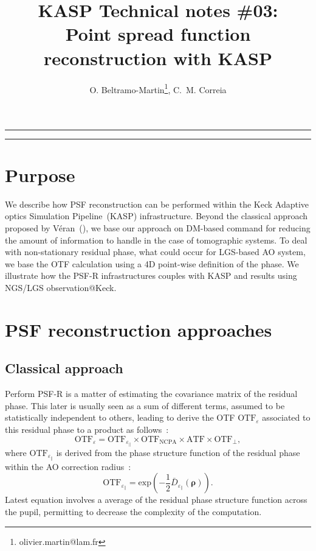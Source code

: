 \documentclass[12pt]{article}
\title{KASP Technical notes \#03:\\ Point spread function reconstruction with KASP}
\author{O. Beltramo-Martin\footnote{olivier.martin@lam.fr}, C.~M. Correia}
\newcommand{\para}[1]{\left(#1\right)}
\newcommand{\rhob}{\boldsymbol{\rho}}
\newcommand{\otf}[1]{\text{OTF}_{#1}}
\begin{document}
\maketitle

\rule{\columnwidth}{0.1mm}
\tableofcontents
\rule{\columnwidth}{0.1mm}

\section{Purpose}

We describe how PSF reconstruction can be performed within the Keck Adaptive optics Simulation Pipeline~(KASP) infrastructure. Beyond the classical approach proposed by V\'eran~(\cite{Veran1997}), we base our approach on DM-based command for reducing the amount of information to handle in the case of tomographic systems. To deal with non-stationary residual phase, what could occur for LGS-based AO system, we base the OTF calculation using a 4D point-wise definition of the phase. We illustrate how the PSF-R infrastructures couples with KASP and results using NGS/LGS observation@Keck.


\section{PSF reconstruction approaches}
\subsection{Classical approach}

Perform PSF-R is a matter of estimating the covariance matrix of the residual phase. This later is usually seen as a sum of different terms, assumed to be statistically independent to others, leading to derive the OTF $\otf{\varepsilon}$ associated to this residual phase to a product as follows~:
\begin{equation} \label{E:otfproduct}
	\otf{\varepsilon} = \otf{\varepsilon_\parallel}\times \otf{\text{NCPA}}\times \text{ATF} \times \otf{\perp} ,
\end{equation}
where $\otf{\varepsilon_\parallel}$ is derived from the phase structure function of the residual phase within the AO correction radius~:
\begin{equation} \label{E:otfveran}
	\otf{\varepsilon_\parallel} = \text{exp}\para{-\dfrac{1}{2} \bar{D}_{\varepsilon_\parallel}(\rhob)}.
\end{equation}
Latest equation involves a average of the residual phase structure function across the pupil, permitting to decrease the complexity of the computation.
\end{document}
